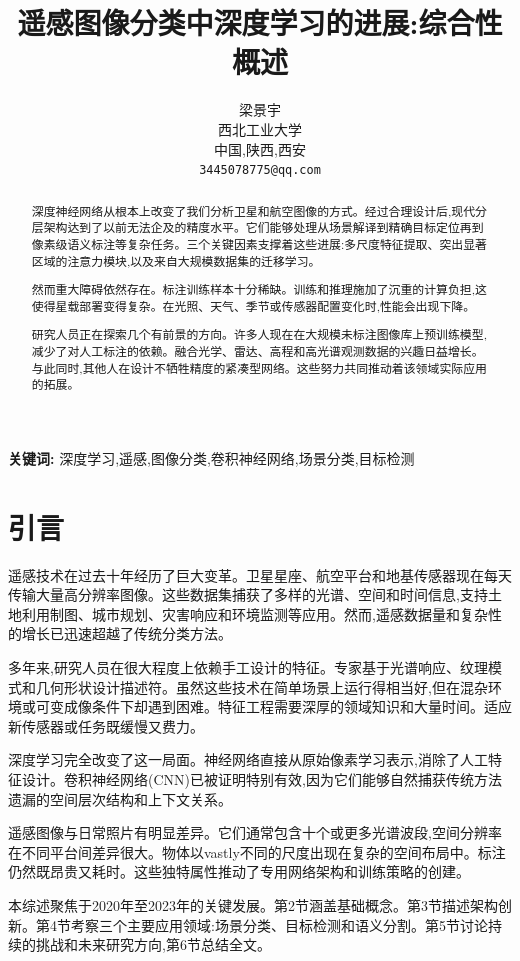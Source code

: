 \documentclass[12pt,a4paper]{article}
\title{\fontsize{14}{17}\selectfont\textbf{遥感图像分类中深度学习的进展:综合性概述}}
\author{梁景宇\\
        西北工业大学\\
        中国,陕西,西安\\
        \texttt{3445078775@qq.com}}
\date{}
\begin{document}
\maketitle

\begin{abstract}
深度神经网络从根本上改变了我们分析卫星和航空图像的方式。经过合理设计后,现代分层架构达到了以前无法企及的精度水平。它们能够处理从场景解译到精确目标定位再到像素级语义标注等复杂任务。三个关键因素支撑着这些进展:多尺度特征提取、突出显著区域的注意力模块,以及来自大规模数据集的迁移学习。

然而重大障碍依然存在。标注训练样本十分稀缺。训练和推理施加了沉重的计算负担,这使得星载部署变得复杂。在光照、天气、季节或传感器配置变化时,性能会出现下降。

研究人员正在探索几个有前景的方向。许多人现在在大规模未标注图像库上预训练模型,减少了对人工标注的依赖。融合光学、雷达、高程和高光谱观测数据的兴趣日益增长。与此同时,其他人在设计不牺牲精度的紧凑型网络。这些努力共同推动着该领域实际应用的拓展。
\end{abstract}

\textbf{关键词:} 深度学习,遥感,图像分类,卷积神经网络,场景分类,目标检测

\section{引言}
\label{sec:introduction}
遥感技术在过去十年经历了巨大变革。卫星星座、航空平台和地基传感器现在每天传输大量高分辨率图像。这些数据集捕获了多样的光谱、空间和时间信息,支持土地利用制图、城市规划、灾害响应和环境监测等应用。然而,遥感数据量和复杂性的增长已迅速超越了传统分类方法。

多年来,研究人员在很大程度上依赖手工设计的特征。专家基于光谱响应、纹理模式和几何形状设计描述符。虽然这些技术在简单场景上运行得相当好,但在混杂环境或可变成像条件下却遇到困难。特征工程需要深厚的领域知识和大量时间。适应新传感器或任务既缓慢又费力。

深度学习完全改变了这一局面。神经网络直接从原始像素学习表示,消除了人工特征设计。卷积神经网络(CNN)已被证明特别有效,因为它们能够自然捕获传统方法遗漏的空间层次结构和上下文关系。

遥感图像与日常照片有明显差异。它们通常包含十个或更多光谱波段,空间分辨率在不同平台间差异很大。物体以vastly不同的尺度出现在复杂的空间布局中。标注仍然既昂贵又耗时。这些独特属性推动了专用网络架构和训练策略的创建。

本综述聚焦于2020年至2023年的关键发展。第2节涵盖基础概念。第3节描述架构创新。第4节考察三个主要应用领域:场景分类、目标检测和语义分割。第5节讨论持续的挑战和未来研究方向,第6节总结全文。
\end{document}
